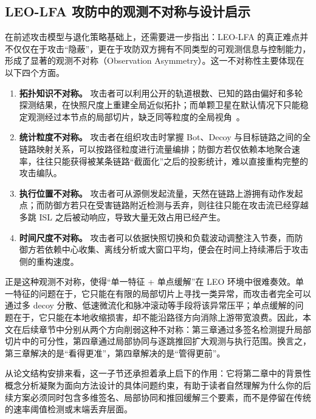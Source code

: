 \subsection{LEO-LFA 攻防中的观测不对称与设计启示}

在前述攻击模型与退化策略基础上，还需要进一步指出：LEO-LFA 的真正难点并不仅仅在于攻击“隐蔽”，更在于攻防双方拥有不同类型的可观测信息与控制能力，形成了显著的观测不对称（Observation Asymmetry）。这一不对称性主要体现在以下四个方面。

\begin{enumerate}
    \item \textbf{拓扑知识不对称。} 攻击者可以利用公开的轨道根数、已知的路由偏好和多轮探测结果，在快照尺度上重建全局近似拓扑；而单颗卫星在默认情况下只能稳定观测经过本节点的局部切片，缺乏同等粒度的全局视角~\cite{crossfire, icarus}。
    \item \textbf{统计粒度不对称。} 攻击者在组织攻击时掌握 Bot、Decoy 与目标链路之间的全链路映射关系，可以按路径粒度进行流量编排；防御方若仅依赖本地聚合速率，往往只能获得被某条链路“截面化”之后的投影统计，难以直接重构完整的攻击编队。
    \item \textbf{执行位置不对称。} 攻击者可从源侧发起流量，天然在链路上游拥有动作发起点；而防御方若只在受害链路附近检测与丢弃，则往往只能在攻击流已经穿越多跳 ISL 之后被动响应，导致大量无效占用已经产生。
    \item \textbf{时间尺度不对称。} 攻击者可以依据快照切换和负载波动调整注入节奏，而防御方若依赖中心收集、离线分析或大窗口平均，便会在时间上持续滞后于攻击侧的重构速度。
\end{enumerate}

正是这种观测不对称，使得“单一特征 + 单点缓解”在 LEO 环境中很难奏效。单一特征的问题在于，它只能在有限的局部切片上寻找一类异常，而攻击者完全可以通过多 decoy 分散、低速微流化和脉冲滚动等手段将该异常压平；单点缓解的问题在于，它只能在本地收缩损害，却不能沿路径方向消除上游带宽浪费。因此，本文在后续章节中分别从两个方向削弱这种不对称：第三章通过多签名检测提升局部切片中的可分性，第四章通过局部协同与逐跳推回扩大观测与执行范围。换言之，第三章解决的是“看得更准”，第四章解决的是“管得更前”。

从论文结构安排来看，这一子节还承担着承上启下的作用：它将第二章中的背景性概念分析凝聚为面向方法设计的具体问题约束，有助于读者自然理解为什么你的后续方案必须同时包含多维签名、局部协同和推回缓解三个要素，而不是停留在传统的速率阈值检测或末端丢弃层面。

